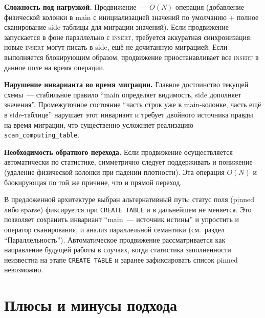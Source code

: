 \textbf{Сложность под нагрузкой.} Продвижение~--- $O(N)$ операция
(добавление физической колонки в main с инициализацией значений по
умолчанию + полное сканирование side-таблицы для миграции
значений). Если продвижение запускается в фоне параллельно с
\textsc{insert}, требуется аккуратная синхронизация: новые
\textsc{insert} могут писать в side, ещё не дочитанную миграцией.
Если выполняется блокирующим образом, продвижение приостанавливает
все \textsc{insert} в данное поле на время операции.

\textbf{Нарушение инварианта во время миграции.} Главное достоинство
текущей схемы~--- стабильное правило ``main определяет видимость, side
дополняет значения''. Промежуточное состояние ``часть строк уже в
main-колонке, часть ещё в side-таблице'' нарушает этот инвариант и
требует двойного источника правды на время миграции, что
существенно усложняет реализацию \texttt{scan\_computing\_table}.

\textbf{Необходимость обратного перехода.} Если продвижение
осуществляется автоматически по статистике, симметрично следует
поддерживать и понижение (удаление физической колонки при падении
плотности). Эта операция $O(N)$ и блокирующая по той же причине,
что и прямой переход.

В предложенной архитектуре выбран альтернативный путь: статус поля
(pinned либо sparse) фиксируется при \texttt{CREATE TABLE} и в
дальнейшем не меняется. Это позволяет сохранить инвариант
``main~--- источник истины'' и упростить и оператор сканирования, и
анализ параллельной семантики (см.~раздел ``Параллельность'').
Автоматическое продвижение рассматривается как направление будущей
работы в случаях, когда статистика заполненности неизвестна на
этапе \texttt{CREATE TABLE} и заранее зафиксировать список pinned
невозможно.

\section{Плюсы и минусы подхода}

